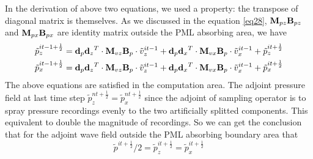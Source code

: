 \documentclass[revised,endfloat]{geophysics}
\begin{document}
In the derivation of above two equations, we used a property: the transpose of diagonal matrix is themselves. 
As we discussed in the equation \ref{eq28}, ${\bf M}_{pz}{\bf B}_{pz}$ and ${\bf M}_{px}{\bf B}_{px}$ are identity matrix outside the PML absorbing area, we have
\begin{equation}
\begin{split}
\tilde{p}_z^{it-1+\frac{1}{2}} = {{\bf d}_p{\bf d}_z}^T \cdot {{\bf M}_{vz}{\bf B}_{p}} \cdot \tilde{v}_z^{it-1} +  {{\bf d}_p{\bf d}_x}^T \cdot {{\bf M}_{vx}{\bf B}_{p}} \cdot \tilde{v}_x^{it-1} + \tilde{p}_z^{it+\frac{1}{2}} \\  
\tilde{p}_x^{it-1+\frac{1}{2}} = {{\bf d}_p{\bf d}_z}^T \cdot {{\bf M}_{vz}{\bf B}_{p}} \cdot \tilde{v}_z^{it-1}+  {{\bf d}_p{\bf d}_x}^T \cdot {{\bf M}_{vx}{\bf B}_{p}} \cdot \tilde{v}_x^{it-1} + \tilde{p}_x^{it+\frac{1}{2}} \\  
\end{split}
\label{eq75}
\end{equation}
The above equations are satisfied in the computation area. The adjoint pressure field at last time step  ${\tilde p}_z^{nt+\frac{1}{2}} = {\tilde p}_x^{nt+\frac{1}{2}}$ since the adjoint of sampling operator is to spray pressure recordings evenly to the two artificially splitted components. This equivalent to double the magnitude of recordings.
So we can get the conclusion that for the adjoint wave field outside the PML absorbing boundary area that
\begin{equation}
\tilde{p}^{it+\frac{1}{2}}/2  = \tilde{p}_z^{it+\frac{1}{2}} = \tilde{p}_x^{it+\frac{1}{2}}
\label{eq76}
\end{equation}
\end{document}
